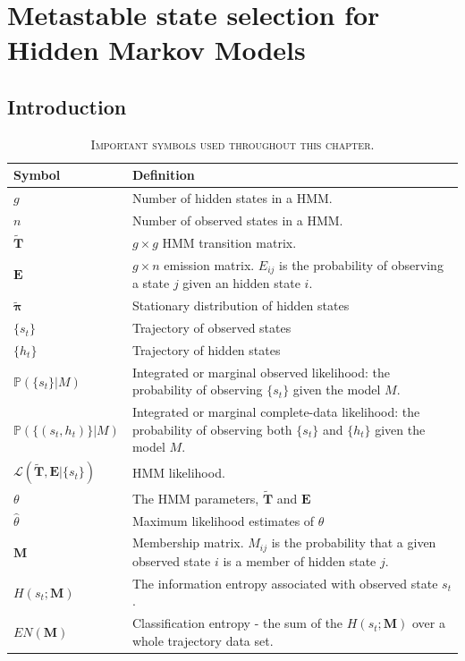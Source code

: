 \let\textcircled=\pgftextcircled
\chapter{Metastable state selection for Hidden Markov Models}
\label{chap:hmm}




\section{Introduction}
\begin{table}
    \centering
    \caption[Important symbols]{\textsc{Important symbols used throughout this chapter}.}
    \begin{tabularx}{0.9\textwidth}{ l >{\raggedright\arraybackslash}X } 
    \hline
    \textbf{Symbol}  &  \textbf{Definition} \\
    \hline\hline
    $g$ & Number of hidden states in a HMM. \\
    $n$ & Number of observed states in a HMM. \\
    $\mathbf{\tilde{T}}$ & $g\times g$ HMM transition matrix. \\
    $\mathbf{E}$ & $g \times n$ emission matrix. $E_{ij}$ is the probability of observing a state $j$ given an hidden state $i$. \\
    $\tilde{\bm{\pi}}$ & Stationary distribution of hidden states \\
    $\{s_{t}\}$ & Trajectory of observed states \\
    $\{h_{t}\}$ & Trajectory of hidden states \\
    $\mathbb{P}(\{s_t\}|M)$ & Integrated or marginal observed likelihood: the probability of observing $\{s_t\}$ given the model $M$. \\
    $\mathbb{P}(\{(s_t, h_t)\}|M)$ & Integrated or marginal complete-data likelihood: the probability of observing both $\{s_t\}$ and $\{h_t\}$ given the model $M$.  \\
    $\mathcal{L}\left(\tilde{\mathbf{T}}, \mathbf{E}| \{s_t\}\right)$ &  HMM likelihood. \\
    $\theta$ & The HMM parameters, $\tilde{\mathbf{T}}$ and $\mathbf{E}$\\
    $\hat{\theta}$ & Maximum likelihood estimates of $\theta$ \\
    $\mathbf{M}$ & Membership matrix. $M_{ij}$ is the probability that a given observed state $i$ is a member of hidden state $j$. \\
    $H(s_{t}; \mathbf{M})$ & The information entropy associated with observed state $s_{t}$. \\
    $EN(\mathbf{M})$ & Classification entropy - the sum of the $H(s_{t}; \mathbf{M})$ over a whole trajectory data set. \\
    \hline
    \end{tabularx}
    \label{tab:hmm_symbols}
\end{table}
